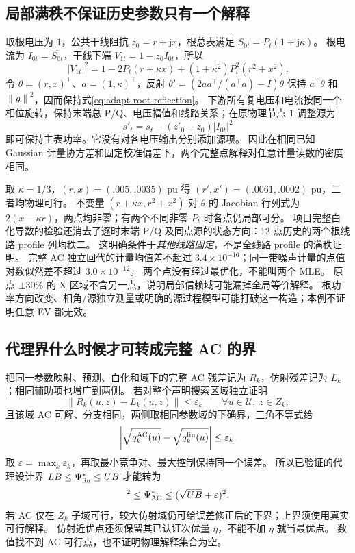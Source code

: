 \documentclass[UTF8,fontset=fandol,11pt,a4paper]{ctexart}
\newcommand{\norm}[1]{\left\lVert#1\right\rVert}
\begin{document}
\subsection{局部满秩不保证历史参数只有一个解释}
取根电压为 $1$，公共干线阻抗 $z_0=r+\mathrm jx$，根总表满足 $S_{0t}=P_t(1+\mathrm j\kappa)$。
根电流为 $I_{0t}=\overline{S_{0t}}$，干线下端 $V_{1t}=1-z_0I_{0t}$，所以
\begin{equation}
 |V_{1t}|^2=1-2P_t(r+\kappa x)
 +(1+\kappa^2)P_t^2(r^2+x^2).\label{eq:adapt-root-reflection}
\end{equation}
令 $\theta=(r,x)^\top$、$a=(1,\kappa)^\top$，反射
$\theta'=(2aa^\top/(a^\top a)-I)\theta$ 保持 $a^\top\theta$ 和 $\norm{\theta}^2$，因而保持式\eqref{eq:adapt-root-reflection}。
下游所有复电压和电流按同一个相位旋转，保持末端总 P/Q、电压幅值和线路关系；在原物理节点 $1$ 调整源为
\[
 s'_t=s_t-(z'_0-z_0)|I_{0t}|^2
\]
即可保持主表功率。它没有对各电压输出分别添加源项。
因此在相同已知 Gaussian 计量协方差和固定校准偏差下，两个完整点解释对任意计量读数的密度相同。

取 $\kappa=1/3$，$(r,x)=(.005,.0035)$ pu 得 $(r',x')=(.0061,.0002)$ pu，二者均物理可行。
不变量 $(r+\kappa x,r^2+x^2)$ 对 $\theta$ 的 Jacobian 行列式为 $2(x-\kappa r)$，两点均非零；有两个不同非零 $P_t$ 时各点仍局部可分。
项目完整白化导数的检验还消去了逐时末端 P/Q 及同点源的状态方向：12 点历史的两个根线路 profile 列均秩二。
这明确条件于\emph{其他线路固定}，不是全线路 profile 的满秩证明。
完整 AC 独立回代的计量均值差不超过 $3.4\times10^{-16}$；同一带噪声计量的点值对数似然差不超过 $3.0\times10^{-12}$。
两个点没有经过最优化，不能叫两个 MLE。
原点 $\pm30\%$ 的 X 区域不含另一点，说明局部信赖域可能漏掉全局等价解释。
根功率方向改变、相角/源独立测量或明确的源过程模型可能打破这一构造；本例不证明任意 EV 都无效。

\subsection{代理界什么时候才可转成完整 AC 的界}
把同一参数映射、预测、白化和域下的完整 AC 残差记为 $R_k$，仿射残差记为 $L_k$；相同辅助项也增广到两侧。
若对整个声明搜索区域独立证明
\begin{equation}
 \norm{R_k(u,z)-L_k(u,z)}\le\varepsilon_k
 \qquad\forall u\in\mathcal U,\ z\in Z_k,\label{eq:adapt-uniform-taylor}
\end{equation}
且该域 AC 可解、分支相同，两侧取相同参数域的下确界，三角不等式给
\begin{equation}
 \left|\sqrt{q_k^{\rm AC}(u)}-\sqrt{q_k^{\rm lin}(u)}\right|
 \le\varepsilon_k.
\end{equation}
取 $\varepsilon=\max_k\varepsilon_k$，再取最小竞争对、最大控制保持同一个误差。
所以已验证的代理设计界 $LB\le\Psi_{\rm lin}^*\le UB$ 才能转为
\begin{equation}
 [\max(0,\sqrt{LB}-\varepsilon)]^2
 \le\Psi_{\rm AC}^*\le(\sqrt{UB}+\varepsilon)^2.\label{eq:adapt-AC-bound}
\end{equation}
若 AC 仅在 $Z_k$ 子域可行，较大仿射域仍可给误差修正后的下界；上界须使用真实可行解释。
仿射近优点还须保留其已认证次优量 $\eta$，不能不加 $\eta$ 就当最优点。
数值找不到 AC 可行点，也不证明物理解释集合为空。
\end{document}
